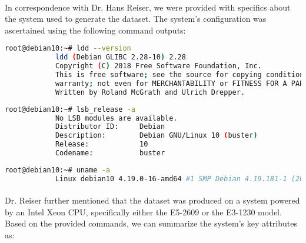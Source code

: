         \paragraph{}In correspondence with Dr. Hans Reiser, we were provided with specifics about the system used to generate the dataset. The system's configuration was ascertained using the following command outputs:

        \begin{minipage}{\dimexpr\linewidth-20pt}
        \begin{lstlisting}[language=bash, caption={C-library version utilized during dataset generation}]
            root@debian10:~# ldd --version
            ldd (Debian GLIBC 2.28-10) 2.28
            Copyright (C) 2018 Free Software Foundation, Inc.
            This is free software; see the source for copying conditions.  There is NO
            warranty; not even for MERCHANTABILITY or FITNESS FOR A PARTICULAR PURPOSE.
            Written by Roland McGrath and Ulrich Drepper.
        \end{lstlisting}
        \end{minipage}

        \begin{minipage}{\dimexpr\linewidth-20pt}
        \begin{lstlisting}[language=bash, caption={Linux Standard Base Release details}]
            root@debian10:~# lsb_release -a
            No LSB modules are available.
            Distributor ID:     Debian
            Description:        Debian GNU/Linux 10 (buster)
            Release:            10
            Codename:           buster
        \end{lstlisting}
        \end{minipage}

        \begin{minipage}{\dimexpr\linewidth-20pt}
        \begin{lstlisting}[language=bash, caption={Operating system and kernel version details}]
            root@debian10:~# uname -a
            Linux debian10 4.19.0-16-amd64 #1 SMP Debian 4.19.181-1 (2021-03-19) x86_64 GNU/Linux
        \end{lstlisting}
        \end{minipage}

        \paragraph{}Dr. Reiser further mentioned that the dataset was produced on a system powered by an Intel Xeon CPU, specifically either the E5-2609 or the E3-1230 model. Based on the provided commands, we can summarize the system's key attributes as:

